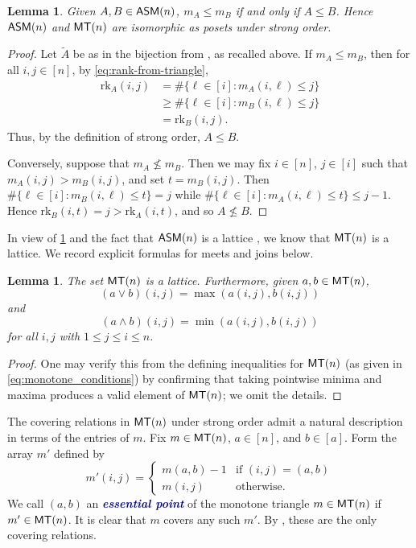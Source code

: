 \documentclass[12 pt]{amsart}
\newcommand{\newword}[1]{\textcolor{darkblue}{\textbf{\emph{#1}}}}
\newtheorem{lemma}[Theorem]{Lemma}
\numberwithin{equation}{section}
\newcommand{\rk}{\mathrm{rk}}
\theoremstyle{remark}
\newcommand{\asm}{{\sf ASM}}
\newcommand{\monotone}{{\sf MT}}
\begin{document}
\begin{lemma}
\label{lemma:monotone_and_rank_induce_same_poset}
    Given $A,B\in \asm(n)$, $m_A\leq m_B$ if and only if $A \leq B$. Hence $\asm(n)$ and $\monotone(n)$ are isomorphic as posets under strong order.
\end{lemma}
\begin{proof}
Let $\widetilde{A}$ be as in the bijection from \cite{MRR83}, as recalled above.  
If $m_A\leq m_B$, then for all $i,j\in [n]$, by \cref{eq:rank-from-triangle},
        \begin{align*}
        \rk_A(i,j)&= \#\{\ell \in [i] : m_A(i,\ell) \leq j\}\\
        &\geq \#\{\ell \in [i] : m_B(i,\ell) \leq j\}\\
        &=\rk_B(i,j).
    \end{align*}
Thus, by the definition of strong order, $A \leq B$.  

Conversely, suppose that $m_A\not \leq m_B$.  Then we may fix $i \in [n]$, $j \in [i]$ such that $m_A(i,j)>m_B(i,j)$, and set $t = m_B(i,j)$. 
 Then $\#\{\ell \in [i] : m_B(i,\ell) \leq t\} = j$ while $\#\{\ell \in [i] : m_A(i,\ell) \leq t\} \leq j-1$.  Hence $\rk_B(i,t) = j>\rk_A(i,t)$, and so $A\not \leq B$.
\end{proof}




In view of \cref{lemma:monotone_and_rank_induce_same_poset} and the fact that $\asm(n)$ is a lattice \cite{LS96}, we know that $\monotone(n)$ is a lattice. We record explicit formulas for meets and joins below. 

\begin{lemma}
\label{jointmeetMT}
    The set $\monotone(n)$ is a lattice.  Furthermore, given $a,b\in \monotone(n)$,
    \[(a\vee b)(i,j)=\max(a(i,j),b(i,j))\] and
    \[(a\wedge b)(i,j)=\min(a(i,j),b(i,j))\]
    for all $i,j$ with $1\leq j\leq i\leq n$.
\end{lemma}
\begin{proof}
    One may verify this from the defining inequalities for $\monotone(n)$ (as given in \cref{eq:monotone_conditions}) by confirming that taking pointwise minima and maxima produces a valid element of $\monotone(n)$; we omit the details.
\end{proof}

The covering relations in $\monotone(n)$ under strong order admit a natural description in terms of the entries of $m$. Fix $m\in \monotone(n)$, $a \in [n]$, and $b \in [a]$.  Form the array $m'$ defined by 
\[m'(i,j)=\begin{cases}
    m(a,b)-1 &\text{if } (i,j)=(a,b)\\
    m(i,j) &\text{otherwise.}
\end{cases}
\] 
We call $(a,b)$ an \newword{essential point} of the monotone triangle $m\in \monotone(n)$ if $m'\in \monotone(n)$. It is clear that $m$ covers any such $m'$. By \cite[Corollary 6.7]{For08}, these are the only covering relations.
\end{document}
